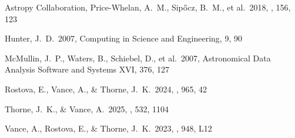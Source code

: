 \documentclass[twocolumn]{aastex631}
\begin{document}
\begin{thebibliography}{}
Astropy Collaboration, Price-Whelan, A.~M., Sip{\H{o}}cz, B.~M., et al.\ 2018, \aj, 156, 123

Hunter, J.~D.\ 2007, Computing in Science and Engineering, 9, 90

McMullin, J.~P., Waters, B., Schiebel, D., et al.\ 2007, Astronomical Data Analysis Software and Systems XVI, 376, 127

Rostova, E., Vance, A., \& Thorne, J.~K.\ 2024, \apj, 965, 42

Thorne, J.~K., \& Vance, A.\ 2025, \mnras, 532, 1104

Vance, A., Rostova, E., \& Thorne, J.~K.\ 2023, \apjl, 948, L12

\end{thebibliography}
\end{document}

